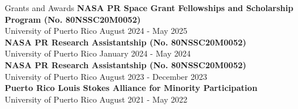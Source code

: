 \documentclass{resume} %
\begin{document}
\begin{rSection}{Grants and Awards}
    \textbf{NASA PR Space Grant Fellowships and Scholarship Program (No.
    80NSSC20M0052)} \\
    University of Puerto Rico \hfill{August 2024 - May 2025}    \\


    \textbf{NASA PR Research Assistantship (No.
    80NSSC20M0052)} \\
    University of Puerto Rico \hfill{January 2024 - May 2024}    \\

    \textbf{NASA PR Research Assistantship (No.
    80NSSC20M0052)} \\
    University of Puerto Rico \hfill{August 2023 - December 2023}    \\

    \textbf{Puerto Rico Louis Stokes Alliance for Minority Participation} \\
    University of Puerto Rico \hfill{August 2021 - May 2022} \\
\end{rSection}
\end{document}
